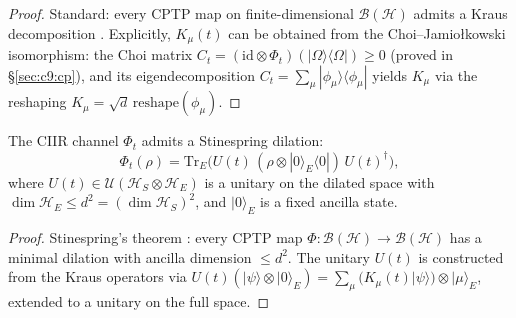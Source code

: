 \begin{proof}
Standard: every CPTP map on finite-dimensional $\mathcal{B}(\mathcal{H})$
admits a Kraus decomposition \cite{Kraus1983}.  Explicitly,
$K_\mu(t)$ can be obtained from the Choi--Jamio{\l}kowski isomorphism:
the Choi matrix $C_t = (\mathrm{id} \otimes \Phi_t)(|\Omega\rangle
\langle\Omega|) \geq 0$ (proved in \S\ref{sec:c9:cp}), and its
eigendecomposition $C_t = \sum_\mu |\phi_\mu\rangle\langle\phi_\mu|$
yields $K_\mu$ via the reshaping $K_\mu = \sqrt{d}\,
\mathrm{reshape}(\phi_\mu)$.
\end{proof}

\begin{theorem}
\label{thm:c9:stinespring}
The CIIR channel $\Phi_t$ admits a Stinespring dilation:
\begin{equation}
  \Phi_t(\rho) = \mathrm{Tr}_E\bigl(
    U(t)\, (\rho \otimes |0\rangle_E\langle 0|)\, U(t)^\dagger
  \bigr),
  \label{eq:c9:stinespring}
\end{equation}
where $U(t) \in \mathcal{U}(\mathcal{H}_S \otimes \mathcal{H}_E)$ is a
unitary on the dilated space with
$\dim\mathcal{H}_E \leq d^2 = (\dim\mathcal{H}_S)^2$, and $|0\rangle_E$
is a fixed ancilla state.
\end{theorem}

\begin{proof}
Stinespring's theorem \cite{Stinespring1955}: every CPTP map
$\Phi : \mathcal{B}(\mathcal{H}) \to \mathcal{B}(\mathcal{H})$ has a
minimal dilation with ancilla dimension $\leq d^2$.  The unitary $U(t)$
is constructed from the Kraus operators via
$U(t)(|\psi\rangle \otimes |0\rangle_E) = \sum_\mu (K_\mu(t)|\psi\rangle)
\otimes |\mu\rangle_E$, extended to a unitary on the full space.
\end{proof}

